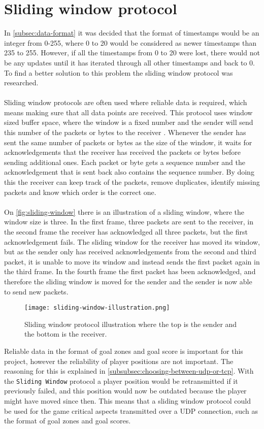 \section{Sliding window protocol}\label{sec:sliding-window}
In \autoref{subsec:data-format} it was decided that the format of timestamps would be an integer from 0-255, where 0 to 20 would be considered as newer timestamps than 235 to 255.
However, if all the timestamps from 0 to 20 were lost, there would not be any updates until it has iterated through all other timestamps and back to 0.
To find a better solution to this problem the sliding window protocol was researched.
\\\\
Sliding window protocols are often used where reliable data is required, which means making sure that all data points are received.
This protocol uses window sized buffer space, where the window is a fixed number and the sender will send this number of the packets or bytes to the receiver \cite{design-and-validation-of-computer-protocols}.
Whenever the sender has sent the same number of packets or bytes as the size of the window, it waits for acknowledgements that the receiver has received the packets or bytes before sending additional ones.
Each packet or byte gets a sequence number and the acknowledgement that is sent back also contains the sequence number.
By doing this the receiver can keep track of the packets, remove duplicates, identify missing packets and know which order is the correct one.
\\\\
On \autoref{fig:sliding-window} there is an illustration of a sliding window, where the window size is three.
In the first frame, three packets are sent to the receiver, in the second frame the receiver has acknowledged all three packets, but the first acknowledgement fails.
The sliding window for the receiver has moved its window, but as the sender only has received acknowledgements from the second and third packet, it is unable to move its window and instead sends the first packet again in the third frame.
In the fourth frame the first packet has been acknowledged, and therefore the sliding window is moved for the sender and the sender is now able to send new packets.
\begin{figure}[H]
    \centering
    \texttt{[image: sliding-window-illustration.png]}
    \caption{Sliding window protocol illustration where the top is the sender and the bottom is the receiver.}
    \label{fig:sliding-window}
\end{figure}
\noindent
Reliable data in the format of goal zones and goal score is important for this project, however the reliability of player positions are not important.
The reasoning for this is explained in \autoref{subsubsec:choosing-between-udp-or-tcp}.
With the \texttt{Sliding Window} protocol a player position would be retransmitted if it previously failed, and this position would now be outdated because the player might have moved since then.
This means that a sliding window protocol could be used for the game critical aspects transmitted over a UDP connection, such as the format of goal zones and goal scores.



